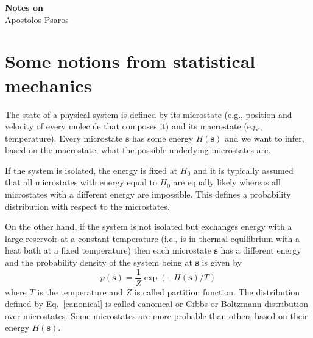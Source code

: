 

\newcommand{\bw}{\boldsymbol{w}}
\newcommand{\bs}{\boldsymbol{s}}
\newcommand{\bx}{\boldsymbol{x}}
\newcommand{\bv}{\boldsymbol{v}}
\newcommand{\bth}{\boldsymbol{\theta}}
\newcommand{\bA}{\boldsymbol{A}}
\newcommand{\cH}{\pazocal{H}}
\newcommand{\cN}{\pazocal{N}}
\newcommand{\cP}{\pazocal{P}}
\newcommand{\cD}{\pazocal{D}}
\newcommand{\cO}{\pazocal{O}}
\newcommand{\cL}{\pazocal{L}}


\setcounter{tocdepth}{3}

	
	\sloppy
	
	\begin{center}	
		\Large
		\textbf{Notes on \textcite{rotskoff2020learning}}\\
		\large
		Apostolos Psaros\\	
	\end{center}
	\vskip 0.25in
	



\section{Some notions from statistical mechanics}
The state of a physical system is defined by its microstate (e.g., position and velocity of every molecule that composes it) and its macrostate (e.g., temperature).
Every microstate $\bs$ has some energy $H(\bs)$ and we want to infer, based on the macrostate, what the possible underlying microstates are. 

If the system is isolated, the energy is fixed at $H_0$ and it is typically assumed that all microstates with energy equal to $H_0$ are equally likely whereas all microstates with a different energy are impossible.
This defines a probability distribution with respect to the microstates. 

On the other hand, if the system is not isolated but exchanges energy with a large reservoir at a constant temperature (i.e., is in thermal equilibrium with a heat bath at a fixed temperature) then each microstate $\bs$ has a different energy and the probability density of the system being at $\bs$ is given by
\begin{equation}\label{canonical}
	p(\bs) = \frac{1}{Z}\exp(-H(\bs)/T)
\end{equation}
where $T$ is the temperature and $Z$ is called partition function.
The distribution defined by Eq.~\eqref{canonical} is called canonical or Gibbs or Boltzmann distribution over microstates. 
Some microstates are more probable than others based on their energy $H(\bs)$.

